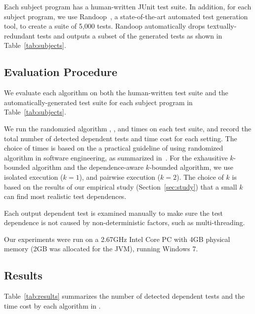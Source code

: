 Each subject program has a human-written JUnit test suite.
In addition, for each subject program, we use
Randoop~\cite{PachecoLET2007}, a state-of-the-art automated
test generation tool, to create a suite of 5,000 tests.
Randoop automatically drops textually-redundant tests 
and outputs a subset of the generated tests as
shown in Table~\ref{tab:subjects}.


\subsection{Evaluation Procedure}

We evaluate each algorithm 
on both the human-written test suite 
and the automatically-generated test suite
for each subject program in Table~\ref{tab:subjects}.


We run the randomzied algorithm \smalltrialnum, \mediumtrialnum,
and \trialnum times on each test suite, and record
the total number of detected dependent tests and time cost
for each setting. The choice of \trialnum times is based
on the a practical guideline of using randomized algorithm
in software engineering, as summarized in~\cite{Arcuri:2011}.
%
For the exhausitive $k$-bounded algorithm
and the dependence-aware $k$-bounded algorithm,
we use isolated execution ($k = 1$), and
pairwise execution ($k = 2$). The choice of $k$ is
based on the results of our empirical
study (Section~\ref{sec:study}) that a small $k$
can find most realistic test dependences.


Each output dependent test is examined manually to make
sure the test dependence is not caused by non-deterministic
factors, such as multi-threading.

Our experiments were run on a 2.67GHz Intel Core PC
with 4GB physical memory (2GB was allocated for the JVM),
running Windows 7.

\subsection{Results}

Table~\ref{tab:results} summarizes the number of detected
dependent tests and the time cost by each algorithm
in \ourtool.

